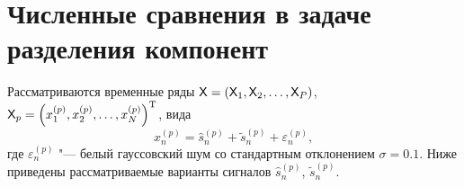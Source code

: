 \documentclass[specialist,
    substylefile = spbu.rtx,
    subf,href,colorlinks=true, 12pt]{disser}
\theoremstyle{plain}
\theoremstyle{definition}
\theoremstyle{remark}
\begin{document}
    
    
    \section{Численные сравнения в задаче разделения компонент}\label{sec:numerical-comp-sep}
    Рассматриваются временные ряды $\mathsf{X} = \left(\mathsf{X}_1, \mathsf{X}_2, \ldots, \mathsf{X}_P\right)$, 
    $\mathsf{X}_p = \left(x_1^{(p)}, x_2^{(p)}, \ldots, x_N^{(p)}\right)^{\mathrm{T}}$, вида
    \begin{equation*}
        x_n^{(p)} = \hat{s}_n^{(p)} + \tilde{s}_n^{(p)} + \varepsilon_n^{(p)},
    \end{equation*}
    где $\varepsilon_n^{(p)}$ "--- белый гауссовский шум со стандартным отклонением $\sigma = 0.1$. 
    Ниже приведены рассматриваемые варианты сигналов $\hat{s}_n^{(p)}$, $\tilde{s}_n^{(p)}$.
\end{document}
